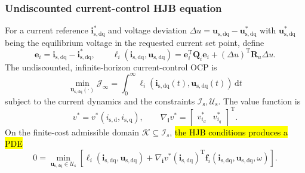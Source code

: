 \begin{frame}
	\frametitle{Undiscounted current-control HJB equation}
	For a current reference $\bm{i}_{\mathrm{s,dq}}^*$ and voltage deviation $\Delta u = \bm{u}_{\mathrm{s,dq}} - \bm{u}_{\mathrm{s,dq}}^*$ with $\bm{u}_{\mathrm{s,dq}}^*$ being the equilibrium voltage in the requested current set point, define
	\begin{equation*}
		\bm{e}_i=\bm{i}_{\mathrm{s,dq}}-\bm{i}_{\mathrm{s,dq}}^*,
		\qquad
		\ell_i(\bm{i}_{\mathrm{s,dq}},\bm{u}_{\mathrm{s,dq}})
		=\bm{e}_i^{\mathrm{T}}\bm{Q}_i\bm{e}_i
			+(\Delta u)^{\mathrm{T}}\bm{R}_u\Delta u .
	\end{equation*}\pause%
	The undiscounted, infinite-horizon current-control OCP is
	\begin{equation*}
		\min_{\bm{u}_{\mathrm{s,dq}}(\cdot)}\mathcal{J}_\infty
		=\int_0^\infty \ell_i(\bm{i}_{\mathrm{s,dq}}(t),\bm{u}_{\mathrm{s,dq}}(t))\,\mathrm{d}t
	\end{equation*}
	subject to the current dynamics and the constraints $\mathcal{I}_\mathrm{s},\mathcal{U}_\mathrm{s}$. \pause%
	The value function is
	\begin{equation*}
		v^*=v^*(i_{\mathrm{s,d}},i_{\mathrm{s,q}}),
		\qquad
		\nabla_{\bm{i}}v^*=\begin{bmatrix}v_{i_d}^* & v_{i_q}^*\end{bmatrix}^{\mathrm{T}} .
	\end{equation*}\pause%
	On the finite-cost admissible domain $\mathcal{K}\subseteq\mathcal{I}_s$, \hl{the HJB conditions produces a PDE}
	\begin{equation*}
		\boxed{0=\min_{\bm{u}_{\mathrm{s,dq}}\in\mathcal{U}_\mathrm{s}}
			\left[\ell_i(\bm{i}_{\mathrm{s,dq}},\bm{u}_{\mathrm{s,dq}})
				+\nabla_{\bm{i}}v^*(\bm{i}_{\mathrm{s,dq}})^{\mathrm{T}}
				\bm{f}_i(\bm{i}_{\mathrm{s,dq}},\bm{u}_{\mathrm{s,dq}},\omega)\right].}
	\end{equation*}
\end{frame}

